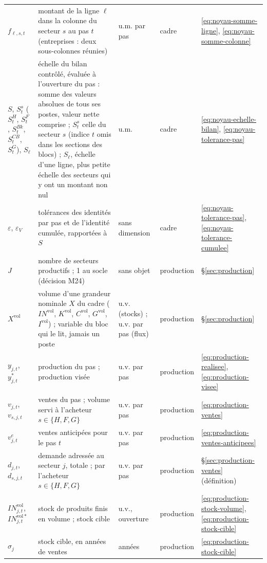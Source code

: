 \documentclass[11pt,a4paper]{article}
\begin{document}
\begin{center}
\begin{longtable}{>{\raggedright\arraybackslash}p{1.6cm}>{\raggedright\arraybackslash}p{5.6cm}>{\raggedright\arraybackslash}p{2.0cm}>{\raggedright\arraybackslash}p{2.2cm}>{\raggedright\arraybackslash}p{2.8cm}}
$f_{\ell,s,t}$ & montant de la ligne $\ell$ dans la colonne du secteur $s$ au pas $t$ (entreprises : deux sous-colonnes réunies) & u.m. par pas & cadre & \eqref{eq:noyau-somme-ligne}, \eqref{eq:noyau-somme-colonne}\\
$S$, $S^s_t$ ($S^H_t$, $S^F_t$, $S^{\mathit{Bk}}_t$, $S^{\mathit{CB}}_t$, $S^G_t$), $S_\ell$ & échelle du bilan contrôlé, évaluée à l'ouverture du pas : somme des valeurs absolues de tous ses postes, valeur nette comprise ; $S^s_t$ celle du secteur $s$ (indice $t$ omis dans les sections des blocs) ; $S_\ell$, échelle d'une ligne, plus petite échelle des secteurs qui y ont un montant non nul & u.m. & cadre & \eqref{eq:noyau-echelle-bilan}, \eqref{eq:noyau-tolerance-pas}\\
$\varepsilon$, $\varepsilon_V$ & tolérances des identités par pas et de l'identité cumulée, rapportées à $S$ & sans dimension & cadre & \eqref{eq:noyau-tolerance-pas}, \eqref{eq:noyau-tolerance-cumulee}\\
$J$ & nombre de secteurs productifs ; 1 au socle (décision M24) & sans objet & production & \S\ref{sec:production}\\
$X^{\mathrm{vol}}$ & volume d'une grandeur nominale $X$ du cadre ($\mathit{IN}^{\mathrm{vol}}$, $K^{\mathrm{vol}}$, $C^{\mathrm{vol}}$, $G^{\mathrm{vol}}$, $I^{\mathrm{vol}}$) ; variable du bloc qui le lit, jamais un poste & u.v. (stocks) ; u.v. par pas (flux) & production & \S\ref{sec:production}\\
$y_{j,t}$, $y^{\ast}_{j,t}$ & production du pas ; production visée & u.v. par pas & production & \eqref{eq:production-realisee}, \eqref{eq:production-visee}\\
$v_{j,t}$, $v_{s,j,t}$ & ventes du pas ; volume servi à l'acheteur $s \in \{H, F, G\}$ & u.v. par pas & production & \eqref{eq:production-ventes}\\
$v^e_{j,t}$ & ventes anticipées pour le pas $t$ & u.v. par pas & production & \eqref{eq:production-ventes-anticipees}\\
$d_{j,t}$, $d_{s,j,t}$ & demande adressée au secteur $j$, totale ; par l'acheteur $s \in \{H, F, G\}$ & u.v. par pas & production & \S\ref{sec:production-ventes} (définition)\\
$\mathit{IN}^{\mathrm{vol}}_{j,t}$, $\mathit{IN}^{\mathrm{vol}\ast}_{j,t}$ & stock de produits finis en volume ; stock cible & u.v., ouverture & production & \eqref{eq:production-stock-volume}, \eqref{eq:production-stock-cible}\\
$\sigma_j$ & stock cible, en années de ventes & années & production & \eqref{eq:production-stock-cible}\\

\end{longtable}
\end{center}
\end{document}
